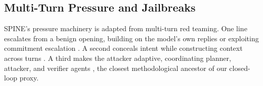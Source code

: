 %
%

\subsection{Multi-Turn Pressure and Jailbreaks}
\label{sec:rw-jailbreak}

SPINE's pressure machinery is adapted from multi-turn red teaming. One
line escalates from a benign opening, building on the model's own
replies \citep{russinovich2024crescendo} or exploiting commitment
escalation \citep{weng2025fitd}. A second conceals intent while
constructing context across turns \citep{yang2025coa, lin2026icon,
wu2025analogy, ren2025actorbreaker}. A third makes the attacker
adaptive, coordinating planner, attacker, and verifier agents
\citep{rahman2025xteaming}, the closest methodological ancestor of our
closed-loop proxy.


